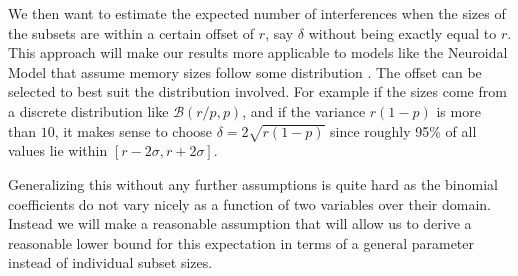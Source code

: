 We then want to estimate the expected number of interferences when the sizes of the subsets are within a certain offset of $r$, say $\delta$ without being exactly equal to $r$. This approach will make our results more applicable to models like the Neuroidal Model that assume memory sizes follow some distribution \cite{valiant2005memorization}. The offset can be selected to best suit the distribution involved. For example if the sizes come from a discrete distribution like $\mathcal{B}(r/p,p)$, and if the variance $r(1-p)$ is more than $10$, it makes sense to choose $\delta  = 2\sqrt{r(1-p)}$ since roughly 95\% of all values lie within $[r-2\sigma,r+2\sigma]$.

Generalizing this without any further assumptions is quite hard as the binomial coefficients do not vary nicely as a function of two variables over their domain. Instead we will make a reasonable assumption that will allow us to derive a reasonable lower bound for this expectation in terms of a general parameter instead of individual subset sizes. 

